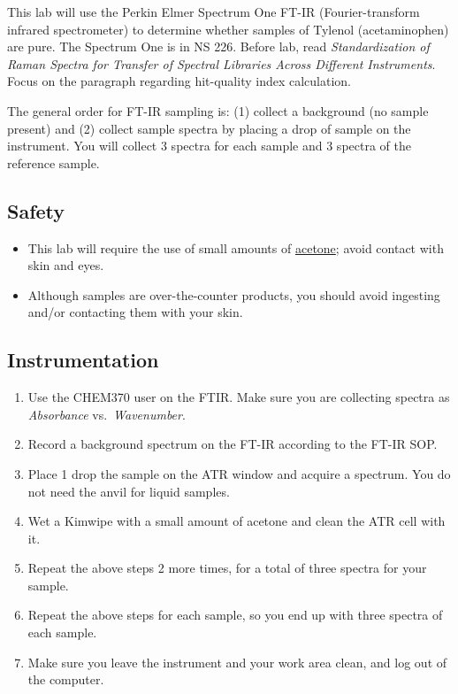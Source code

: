 \documentclass[]{tufte-book}
\providecommand{\tightlist}{%
  \setlength{\itemsep}{0pt}\setlength{\parskip}{0pt}}
\begin{document}
This lab will use the Perkin Elmer Spectrum One FT-IR (Fourier-transform infrared spectrometer) to determine whether samples of Tylenol (acetaminophen) are pure. The Spectrum One is in NS 226. Before lab, read \emph{Standardization of Raman Spectra for Transfer of Spectral Libraries Across Different Instruments}. Focus on the paragraph regarding hit-quality index calculation.

The general order for FT-IR sampling is: (1) collect a background (no sample present) and (2) collect sample spectra by placing a drop of sample on the instrument. You will collect 3 spectra for each sample and 3 spectra of the reference sample.

\hypertarget{safety-3}{%
\subsection*{Safety}\label{safety-3}}

\begin{itemize}
\tightlist
\item
  This lab will require the use of small amounts of \href{http://www.sciencelab.com/msds.php?msdsId=9927062}{acetone}; avoid contact with skin and eyes.
\item
  Although samples are over-the-counter products, you should avoid ingesting and/or contacting them with your skin.
\end{itemize}

\hypertarget{instrumentation-1}{%
\subsection{Instrumentation}\label{instrumentation-1}}

\begin{enumerate}
\def\labelenumi{\arabic{enumi}.}
\tightlist
\item
  Use the CHEM370 user on the FTIR. Make sure you are collecting spectra as \emph{Absorbance} vs.~\emph{Wavenumber}.
\item
  Record a background spectrum on the FT-IR according to the FT-IR SOP.
\item
  Place 1 drop the sample on the ATR window and acquire a spectrum. You do not need the anvil for liquid samples.
\item
  Wet a Kimwipe with a small amount of acetone and clean the ATR cell with it.
\item
  Repeat the above steps 2 more times, for a total of three spectra for your sample.
\item
  Repeat the above steps for each sample, so you end up with three spectra of each sample.
\item
  Make sure you leave the instrument and your work area clean, and log out of the computer.
\end{enumerate}
\end{document}

